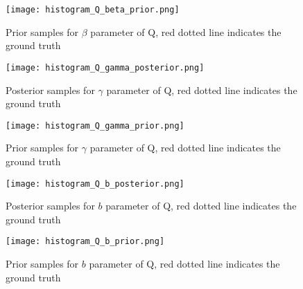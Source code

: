 \begin{figure}[ht]
\vspace{.3in}
\centerline{\texttt{[image: histogram\_Q\_beta\_prior.png]}}
\vspace{.3in}
\caption{Prior samples for $\beta$ parameter of Q, red dotted line indicates the ground truth}
\label{fig:betaprior}
\end{figure}

\begin{figure}[ht]
\vspace{.3in}
\centerline{\texttt{[image: histogram\_Q\_gamma\_posterior.png]}}
\vspace{.3in}
\caption{Posterior samples for $\gamma$ parameter of Q, red dotted line indicates the ground truth}
\label{fig:gamma}
\end{figure}

\begin{figure}[ht]
\vspace{.3in}
\centerline{\texttt{[image: histogram\_Q\_gamma\_prior.png]}}
\vspace{.3in}
\caption{Prior samples for $\gamma$ parameter of Q, red dotted line indicates the ground truth}
\label{fig:gammaprior}
\end{figure}


\begin{figure}[ht]
\vspace{.3in}
\centerline{\texttt{[image: histogram\_Q\_b\_posterior.png]}}
\vspace{.3in}
\caption{Posterior samples for $b$ parameter of Q, red dotted line indicates the ground truth}
\label{fig:b}
\end{figure}

\begin{figure}[ht]
\vspace{.3in}
\centerline{\texttt{[image: histogram\_Q\_b\_prior.png]}}
\vspace{.3in}
\caption{Prior samples for $b$ parameter of Q, red dotted line indicates the ground truth}
\label{fig:bprior}
\end{figure}

%
%
